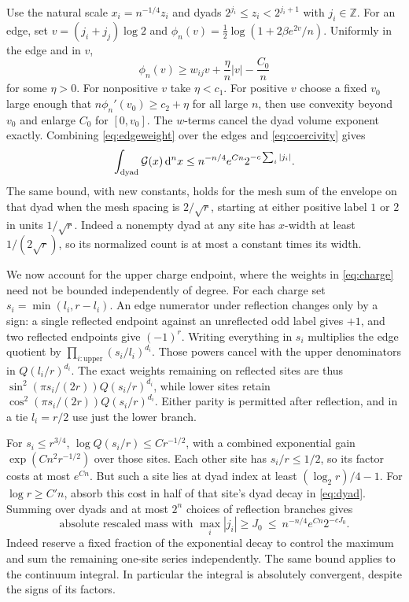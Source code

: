 Use the natural scale \(x_i=n^{-1/4}z_i\) and dyads \(2^{j_i}\le z_i<2^{j_i+1}\) with \(j_i\in\mathbb Z\). For an edge, set \(v=(j_i+j_j)\log2\) and
\(\phi_n(v)=\frac12\log(1+2\beta e^{2v}/n)\). Uniformly in the edge and in \(v\),
\begin{equation}
        \phi_n(v)\ge w_{ij}v+\frac{\eta}{n}|v|-\frac{C_0}{n}
 \label{eq:edgeweight}
\end{equation}
for some \(\eta>0\). For nonpositive \(v\) take \(\eta<c_1\). For positive \(v\) choose a fixed \(v_0\) large enough that \(n\phi_n'(v_0)\ge c_2+\eta\) for all large \(n\), then use convexity beyond \(v_0\) and enlarge \(C_0\) for \([0,v_0]\). The \(w\)-terms cancel the dyad volume exponent exactly. Combining \eqref{eq:edgeweight} over the edges and \eqref{eq:coercivity} gives
\begin{equation}
 \int_{\mathrm{dyad}}{\cal G}(x)\,\mathrm d^n x
           \le n^{-n/4}e^{C n}2^{-c\sum_i|j_i|}.
 \label{eq:dyad}
\end{equation}
The same bound, with new constants, holds for the mesh sum of the envelope on that dyad when the mesh spacing is \(2/\sqrt r\), starting at either positive label \(1\) or \(2\) in units \(1/\sqrt r\). Indeed a nonempty dyad at any site has \(x\)-width at least \(1/(2\sqrt r)\), so its normalized count is at most a constant times its width.

We now account for the upper charge endpoint, where the weights in \eqref{eq:charge} need not be bounded independently of degree. For each charge set \(s_i=\min(l_i,r-l_i)\). An edge numerator under reflection changes only by a sign: a single reflected endpoint against an unreflected odd label gives \(+1\), and two reflected endpoints give \((-1)^r\). Writing everything in \(s_i\) multiplies the edge quotient by \(\prod_{i:\text{upper}} (s_i/l_i)^{d_i}\). Those powers cancel with the upper denominators in \(Q(l_i/r)^{d_i}\). The exact weights remaining on reflected sites are thus
\(\sin^2(\pi s_i/(2r))Q(s_i/r)^{d_i}\), while lower sites retain \(\cos^2(\pi s_i/(2r))Q(s_i/r)^{d_i}\). Either parity is permitted after reflection, and in a tie \(l_i=r/2\) use just the lower branch.

For \(s_i\le r^{3/4}\), \(\log Q(s_i/r)\le C r^{-1/2}\), with a combined exponential gain \(\exp(Cn^2r^{-1/2})\) over those sites. Each other site has \(s_i/r\le1/2\), so its factor costs at most \(e^{Cn}\). But such a site lies at dyad index at least \((\log_2 r)/4-1\). For \(\log r\ge C'n\), absorb this cost in half of that site's dyad decay in \eqref{eq:dyad}. Summing over dyads and at most \(2^n\) choices of reflection branches gives
\begin{equation}
 \text{absolute rescaled mass with }\max_i |j_i|\ge J_0
             \ \le\ n^{-n/4}e^{C n}2^{-cJ_0}.
 \label{eq:tail}
\end{equation}
Indeed reserve a fixed fraction of the exponential decay to control the maximum and sum the remaining one-site series independently. The same bound applies to the continuum integral. In particular the integral is absolutely convergent, despite the signs of its factors.

